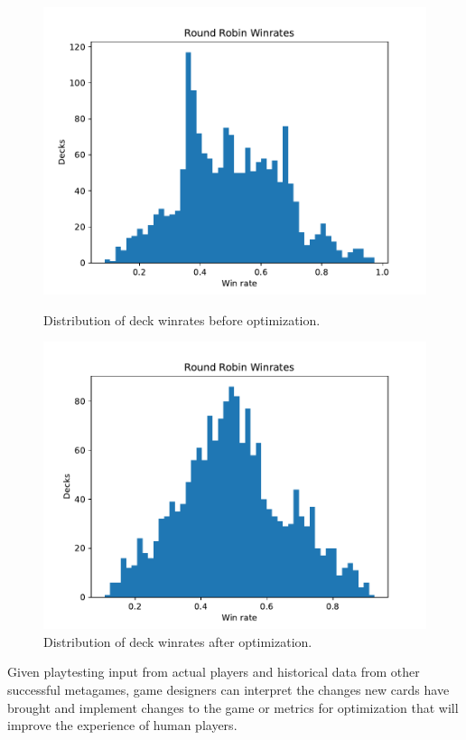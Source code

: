\begin{figure}[t]
	\includegraphics[scale=0.5]{special_only_4_5_8_8_4_8_3_3_3_5}
	\caption{Distribution of deck winrates before optimization. }
	\label{fig:special_only_dist_before}

	\includegraphics[scale=0.5]{special_only_1_3_4_3_3_1_7_8_5_7}
	\caption{Distribution of deck winrates after optimization. }
	\label{fig:special_only_dist_after}
\end{figure}

Given playtesting input from actual players and historical data from other successful metagames, game designers can interpret the %
changes new cards have brought and implement changes to the game or metrics for optimization that will improve the experience of human players.

